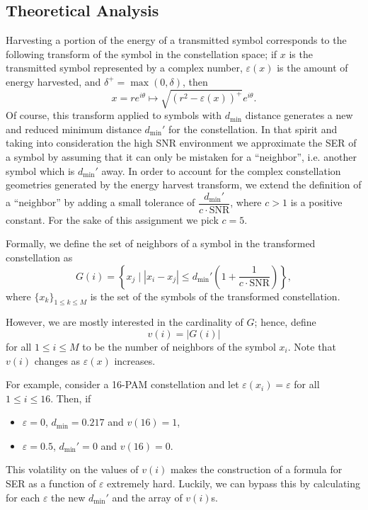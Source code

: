 \documentclass[11pt,a4paper,onecolumn,final]{article}
\newcommand{\dmin}{d_\text{min}}
\newcommand{\eps}{\varepsilon}
\begin{document}
\subsection{Theoretical Analysis}
Harvesting a portion of the energy of a transmitted symbol corresponds to the following transform of the symbol in the constellation space; if \(x\) is the transmitted symbol represented by a complex number, \(\eps(x)\) is the amount of energy harvested, and \(\delta^+ = \max(0, \delta)\), then 
\begin{equation}
    x = re^{i\theta} \mapsto \sqrt{(r^2 - \eps(x))^+} e^{i\theta}. 
\end{equation}
Of course, this transform applied to symbols with \(\dmin\) distance generates a new and reduced minimum distance \(\dmin '\) for the constellation. In that spirit and taking into consideration the high SNR environment we approximate the SER of a symbol by assuming that it can only be mistaken for a ``neighbor'', i.e. another symbol which is \(\dmin '\)  away. In order to account for the complex constellation geometries generated by the energy harvest transform, we extend the definition of a ``neighbor'' by adding a small tolerance of \(\dfrac{\dmin '}{c\cdot\text{SNR}}\), where \(c > 1\) is a positive constant. For the sake of this assignment we pick \(c = 5\). 

Formally, we define the set of neighbors of a symbol in the transformed constellation as 
\begin{equation}
    G(i) = \left\{ x_j \mid |x_i - x_j| \leq \dmin ' \left(1 + \frac{1}{c \cdot \text{SNR}}\right) \right\}, 
\end{equation}
where \(\{x_k\}_{1 \leq k \leq M}\) is the set of the symbols of the transformed constellation.

However, we are mostly interested in the cardinality of \(G\); hence, define 
\begin{equation}
    v(i) = |G(i)| 
\end{equation}
for all \(1 \leq i \leq M\) to be the number of neighbors of the symbol \(x_i\). 
Note that \(v(i)\) changes as \(\eps(x)\) increases. 

For example, consider a 16-PAM constellation and let \(\eps(x_i) = \eps\) for all \(1 \leq i \leq 16\). Then, if 
\begin{itemize}
    \item \(\eps = 0\), \(\dmin = 0.217\) and \(v(16) = 1\), 
    \item \(\eps = 0.5\), \(\dmin ' = 0\) and \(v(16) = 0\). 
\end{itemize}
This volatility on the values of \(v(i)\) makes the construction of a formula for SER as a function of \(\eps\) extremely hard. Luckily, we can bypass this by calculating for each \(\eps\) the new \(\dmin '\) and the array of \(v(i)\)s. 
\end{document}
